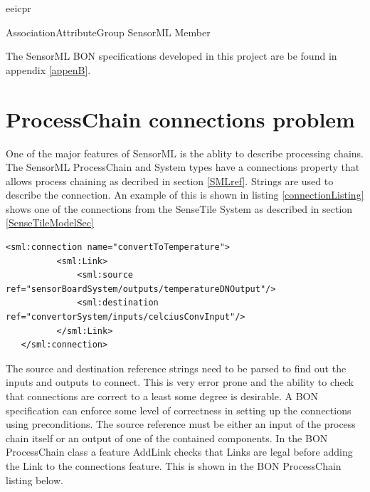 \documentclass[]{final_report}
\begin{document}
eeicpr

AssociationAttributeGroup
SensorML
Member

The SensorML BON specifications developed in this project are be found in appendix \ref{appenB}.



\section{ProcessChain connections problem}
One of the major features of SensorML is the ablity to describe processing chains. The SensorML ProcessChain and System types have a connections property that allows process chaining as decribed in section \ref{SMLref}. Strings are used to describe the connection. An example of this is shown in listing \ref{connectionListing} shows one of the connections from the SenseTile System as described in section \ref{SenseTileModelSec}
\begin{lstlisting}[label=connectionListing,caption=SenseTile System connectionconvertToTemperature]
   <sml:connection name="convertToTemperature">
          <sml:Link>
              <sml:source ref="sensorBoardSystem/outputs/temperatureDNOutput"/>
              <sml:destination ref="convertorSystem/inputs/celciusConvInput"/>
          </sml:Link>
   </sml:connection>

\end{lstlisting}

The source and destination reference strings need to be parsed to find out the inputs and outputs to connect. This is very error prone and the ability to check that connections are correct to a least some degree is desirable. A BON specification can enforce some level of correctness in setting up the connections using preconditions. The source reference must be either an input of the process chain itself or an output of one of the contained components. In the BON ProcessChain class a feature AddLink checks that Links are legal before adding the Link to the connections feature. This is shown in the BON ProcessChain listing below.
\end{document}
